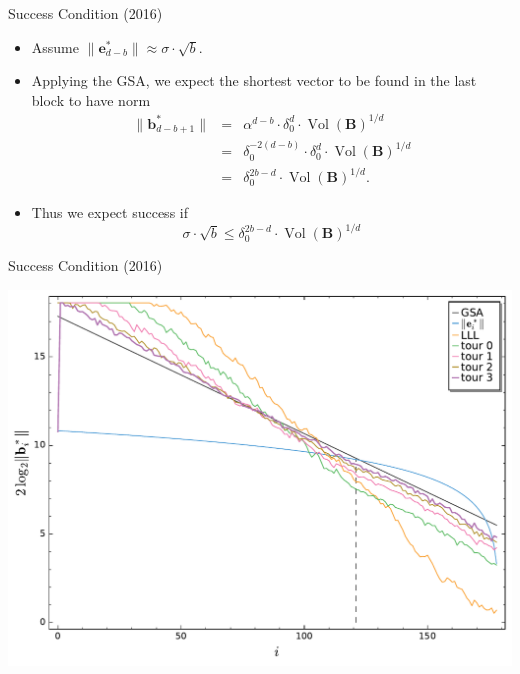 \documentclass[presentation,smaller]{beamer}
\renewcommand{\vec}[1]{\mathbf{#1}\xspace}
\newcommand{\mat}[1]{\mathbf{#1}\xspace}
\DeclareMathOperator{\Vol}{Vol}
\begin{document}
\begin{frame}[label={sec:org3c18426}]{Success Condition (2016)}
\begin{itemize}
\item Assume \(\|\vec{e}^*_{d-b}\| ≈ σ ⋅ \sqrt{b}\).
\item Applying the GSA, we expect the shortest vector to be found in the last block to have norm
\begin{eqnarray*}
 \|\vec{b}_{d-b+1}^*\| &=&  α^{d-b} ⋅ δ_0^d ⋅ {\Vol(\mat{B})}^{1/d}\\
                       &=& δ_0^{-2(d-b)} ⋅ δ_0^d ⋅ {\Vol(\mat{B})}^{1/d}\\
                       &=& δ_0^{2b-d} ⋅ {\Vol(\mat{B})}^{1/d}.
\end{eqnarray*}
\item Thus  we expect success if \[σ ⋅ \sqrt{b} ≤ δ_0^{2b-d} ⋅ {\Vol(\mat{B})}^{1/d}\]
\end{itemize}
\end{frame}

\begin{frame}[label={sec:org3541a75}]{Success Condition (2016)}
\begin{center}
\includegraphics[width=.9\linewidth]{./usvp-2016-visualisation.pdf}
\end{center}
\end{frame}
\end{document}
